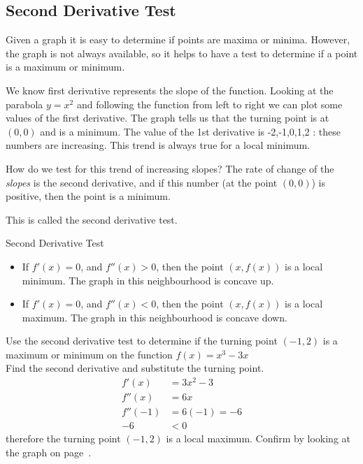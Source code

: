\subsection*{Second Derivative Test}\label{sec:2ndDerivativeTest}
Given a graph it is easy to determine if points are maxima or minima. However, the graph is not always available, so it  helps to have a test to determine if a point is a maximum or minimum.

We know first derivative represents the slope of the function. Looking at the parabola $y=x^2$ and following the function from left to right we can plot some values of the first derivative. The graph tells us that the turning point is at $(0,0)$ and is a minimum. The value of the 1st derivative is -2,-1,0,1,2 : these numbers are increasing. This trend is always true for a local minimum.

How do we test for this trend of increasing slopes? The rate of change of the \emph{slopes} is the second derivative, and if this number (at the point $(0,0)$) is positive, then the point is a minimum.

This is called the second derivative test.\\
\begin{tcolorbox}
	Second Derivative Test
	\begin{itemize}
		\item If $f'(x)=0$, and $f''(x)>0$, then the point $(x,f(x))$ is a local minimum. The graph in this neighbourhood is concave up.\\
		\item If $f'(x)=0$, and $f''(x)<0$, then the point $(x,f(x))$ is a local maximum. The graph in this neighbourhood is concave down.\\
	\end{itemize}
\end{tcolorbox}

\clearpage
\example Use the second derivative test to determine if the turning point $(-1,2)$ is a maximum or minimum on the function $f(x)=x^3-3x$\\
\solution Find the second derivative and substitute the turning point.
\begin{align*}
f'(x)&=3x^2-3\\
f''(x)&=6x\\
f''(-1)&=6(-1)=-6\\
-6&<0
\end{align*}therefore the turning point $(-1,2)$ is a local maximum. Confirm by looking at the graph on page~\pageref{fig:maxMin}.

